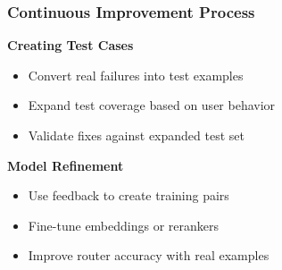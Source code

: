 \begin{frame}
    \frametitle{Continuous Improvement Process}
    
    \textbf{Creating Test Cases}
    \begin{itemize}
        \item Convert real failures into test examples
        \item Expand test coverage based on user behavior
        \item Validate fixes against expanded test set
    \end{itemize}
    
    \vspace{0.3cm}
    \textbf{Model Refinement}
    \begin{itemize}
        \item Use feedback to create training pairs
        \item Fine-tune embeddings or rerankers
        \item Improve router accuracy with real examples
    \end{itemize}
    
    \begin{center}
    \end{center}
\end{frame}


